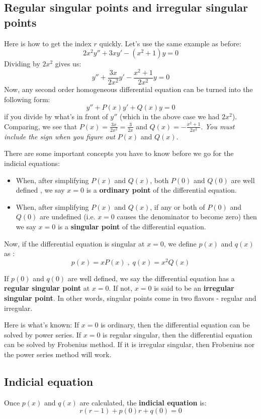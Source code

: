 \documentclass[12pt]{report}
\begin{document}
\subsection*{Regular singular points and irregular singular points }
Here is how to get the index $r$ quickly. Let's use the same example as before:
$$2x^2 y'' + 3xy' - (x^2 +1)y =0$$
Dividing by $2x^2$ gives us:
$$ y'' + \frac{3x}{2x^2} y' - \frac{x^2 +1 }{2x^2} y = 0 $$
Now, any second order homogeneous differential equation can be turned into the following form:
$$ y'' + P(x) y' + Q(x) y =0 $$
if you divide by what's in front of $y''$ (which in the above case we had $2x^2$).
Comparing, we see that $P(x) = \frac{3x}{2x^2} = \frac{3}{2x} $ and $ Q(x) = - \frac{x^2 +1 }{2x^2} $. \textit{You must include the sign when you figure out } $P(x)$ and $Q(x)$.

There are some important concepts you have to know before we go for the indicial equations:
\begin{itemize}
\item When, after simplifying $P(x)$ and $Q(x)$, both $P(0)$ and $Q(0)$ are well defined , we say $x=0$ is a \textbf{ordinary point} of the differential equation.
\item When, after simplifying $P(x)$ and $Q(x)$, if any or both of $P(0)$ and $Q(0)$ are undefined (i.e. $x=0$ causes the denominator to become zero) then we say $x=0$ is a \textbf{singular point} of the differential equation.
\end{itemize}

Now, if the differential equation is singular at $x=0$, we define $p(x)$ and $q(x)$ as :
$$p(x) = x P(x) \; , \; q(x) = x^2 Q(x) $$

If $p(0)$ and $q(0)$ are well defined, we say the differential equation has a \textbf{regular singular point} at $x=0$. If not, $x=0$ is said to be an \textbf{irregular singular point}. In other words, singular points come in two flavors - regular and irregular.

Here is what's known: If $x=0$ is ordinary, then the differential equation can be solved by power series. If $x=0$ is regular singular, then the differential equation can be solved by Frobenius method. If it is irregular singular, then Frobenius nor the power series method will work.

\subsection*{Indicial equation}
Once $p(x)$ and $q(x)$ are calculated, the \textbf{indicial equation } is:
$$r (r-1) + p(0)r + q(0) =0$$
\end{document}
